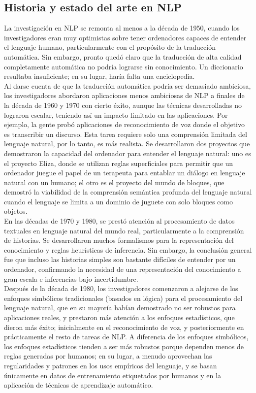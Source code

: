 \subsection{Historia y estado del arte en NLP}

La investigación en NLP se remonta al menos a la década de 1950, cuando los investigadores eran muy optimistas sobre tener ordenadores capaces de entender el lenguaje humano, particularmente con el propósito de la traducción automática. Sin embargo, pronto quedó claro que la traducción de alta calidad completamente automática no podría lograrse sin conocimiento. Un diccionario resultaba insuficiente; en su lugar, haría falta una enciclopedia. \\

Al darse cuenta de que la traducción automática podría ser demasiado ambiciosa, los investigadores abordaron aplicaciones menos ambiciosas de NLP a finales de la década de 1960 y 1970 con cierto éxito, aunque las técnicas desarrolladas no lograron escalar, teniendo así un impacto limitado en las aplicaciones. Por ejemplo, la gente probó aplicaciones de reconocimiento de voz donde el objetivo es transcribir un discurso. Esta tarea requiere solo una comprensión limitada del lenguaje natural, por lo tanto, es más realista. Se desarrollaron dos proyectos que demostraron la capacidad del ordenador para entender el lenguaje natural: uno es el proyecto Eliza, donde se utilizan reglas superficiales para permitir que un ordenador juegue el papel de un terapeuta para entablar un diálogo en lenguaje natural con un humano; el otro es el proyecto del mundo de bloques, que demostró la viabilidad de la comprensión semántica profunda del lenguaje natural cuando el lenguaje se limita a un dominio de juguete con solo bloques como objetos. \\

En las décadas de 1970 y 1980, se prestó atención al procesamiento de datos textuales en lenguaje natural del mundo real, particularmente a la comprensión de historias. Se desarrollaron muchos formalismos para la representación del conocimiento y reglas heurísticas de inferencia. Sin embargo, la conclusión general fue que incluso las historias simples son bastante difíciles de entender por un ordenador, confirmando la necesidad de una representación del conocimiento a gran escala e inferencias bajo incertidumbre. \\

Después de la década de 1980, los investigadores comenzaron a alejarse de los enfoques simbólicos tradicionales (basados en lógica) para el procesamiento del lenguaje natural, que en su mayoría habían demostrado no ser robustos para aplicaciones reales, y prestaron más atención a los enfoques estadísticos, que dieron más éxito; inicialmente en el reconocimiento de voz, y posteriormente en prácticamente el resto de tareas de NLP. A diferencia de los enfoques simbólicos, los enfoques estadísticos tienden a ser más robustos porque dependen menos de reglas generadas por humanos; en su lugar, a menudo aprovechan las regularidades y patrones en los usos empíricos del lenguaje, y se basan únicamente en datos de entrenamiento etiquetados por humanos y en la aplicación de técnicas de aprendizaje automático. \\

